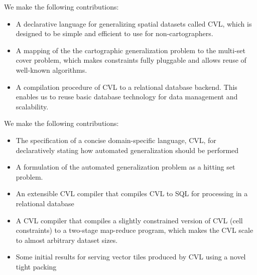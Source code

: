We make the following contributions:

\begin{itemize}
\item A declarative language for generalizing spatial datasets called CVL, which is designed to be simple and efficient to use for non-cartographers.
\item A mapping of the the cartographic generalization problem to the multi-set cover problem, which makes constraints fully pluggable and allows reuse of well-known algorithms.
\item A compilation procedure of CVL to a relational database backend. This enables us to reuse basic database technology for data management and scalability.
\end{itemize}

We make the following contributions:

\begin{itemize}
\item The specification of a concise domain-specific language, CVL, for declaratively stating how automated generalization should be performed
\item A formulation of the automated generalization problem as a hitting set problem.
\item An extensible CVL compiler that compiles CVL to SQL for processing in a relational database
\item A CVL compiler that compiles a slightly constrained version of CVL (cell constraints) to a two-stage map-reduce program, which makes the CVL scale to almost arbitrary dataset sizes.
\item Some initial results for serving vector tiles produced by CVL using a novel tight packing
\end{itemize}
